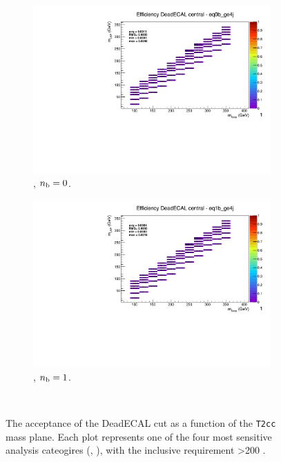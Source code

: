 \begin{figure}[h!]
  \begin{subfigure}[b]{0.4\textwidth}
    \includegraphics[width=\textwidth, page=5]{Figs/sms/t2cc/v37/systs_v2/T2cc_DeadECAL_eq0b_ge4j.pdf}
    \caption{\njhigh, $n_{\text{b}} = 0$.}
  \end{subfigure}
  \begin{subfigure}[b]{0.4\textwidth}
    \includegraphics[width=\textwidth, page=5]{Figs/sms/t2cc/v37/systs_v2/T2cc_DeadECAL_eq1b_ge4j.pdf}
    \caption{\njhigh, $n_{\text{b}} = 1$.}
  \end{subfigure}\\
  \caption{The acceptance of the DeadECAL cut as a function of the \texttt{T2cc}
  mass plane. Each plot represents one of the four most sensitive 
  analysis cateogires (\nb, \nj), with the inclusive requirement \HT>200 \gev.}
  \label{fig:sms-deadecal-t2cc}
\end{figure}

